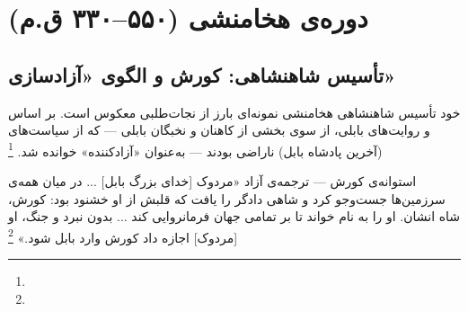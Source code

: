 \section{دوره‌ی هخامنشی (۵۵۰–۳۳۰ ق.م)}
\label{sec:ch04-achaemenid}

\subsection{تأسیس شاهنشاهی: کورش و الگوی «آزادسازی»}
\label{subsec:ch04-cyrus}

خود تأسیس شاهنشاهی هخامنشی نمونه‌ای بارز از نجات‌طلبی معکوس است. بر اساس  و روایت‌های بابلی،  از سوی بخشی از کاهنان و نخبگان بابلی — که از سیاست‌های  (آخرین پادشاه بابل) ناراضی بودند — به‌عنوان «آزادکننده» خوانده شد.%
\footnote{}

\begin{histQuote}{استوانه‌ی کورش — ترجمه‌ی آزاد}
«مردوک [خدای بزرگ بابل] ... در میان همه‌ی سرزمین‌ها جست‌وجو کرد و شاهی دادگر را یافت که قلبش از او خشنود بود: کورش، شاه انشان. او را به نام خواند تا بر تمامی جهان فرمانروایی کند ... بدون نبرد و جنگ، او [مردوک] اجازه داد کورش وارد بابل شود.»%
\footnote{}
\end{histQuote}

